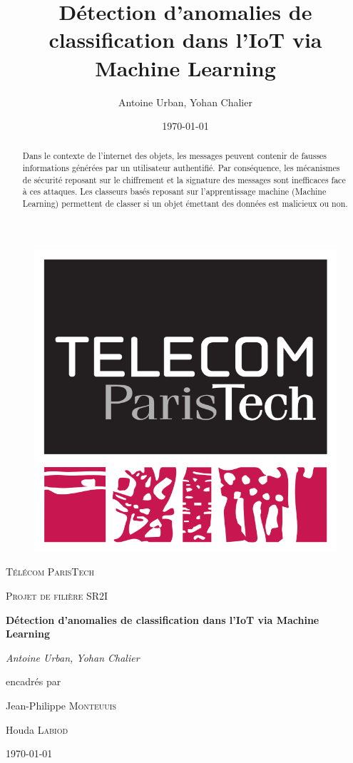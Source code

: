 \documentclass[a4paper]{report}
\title{Détection d'anomalies de classification dans l'IoT via Machine Learning}
\author{Antoine Urban, Yohan Chalier}
\date{\today}
\begin{document}
\begin{titlepage}
	\centering
	\vspace{1cm}
	\begin{figure}
	\centering
	\includegraphics[scale=0.2]{img/logo_TPT.png}
	\end{figure}
	\vspace{1cm}
	{\scshape\LARGE Télécom ParisTech \par}
	\vspace{1cm}
	{\scshape\Large Projet de filière SR2I \par}
	\vspace{1.5cm}
	{\huge\bfseries Détection d'anomalies de classification dans l'IoT via Machine Learning\par}
	\vspace{2cm}
	{\Large\itshape Antoine Urban, Yohan Chalier \par}
	\vfill
	encadrés par\par
	Jean-Philippe \textsc{Monteuuis}\par
	Houda \textsc{Labiod}
	\vfill

	{\large \today\par}
\end{titlepage}


\begin{abstract}
Dans le contexte de l'internet des objets, les messages peuvent contenir de fausses informations générées par un utilisateur authentifié. Par conséquence, les mécanismes de sécurité reposant sur le chiffrement et la signature des messages sont inefficaces face à ces attaques. Les classeurs basés reposant sur l'apprentissage machine (Machine Learning) permettent de classer si un objet émettant des données est malicieux ou non.
\end{abstract}
\end{document}
